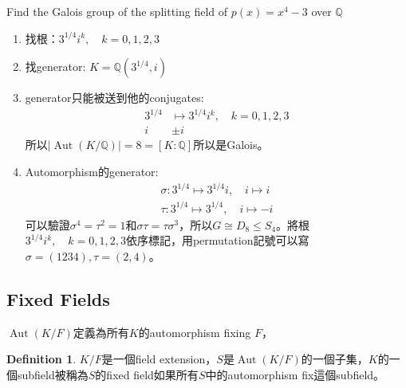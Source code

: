 \documentclass[12pt]{article}
\theoremstyle{definition}
\newtheorem{dfn}{Definition}
\newcommand{\FF}{\mathbb F}
\newcommand{\QQ}{\mathbb Q}
\DeclareMathOperator{\Aut}{Aut}
\begin{document}
\begin{ex}
	Find the Galois group of the splitting field of $p(x)=x^4-3$ over $\QQ$

	\begin{enumerate}
		\item 找根：$3^{1/4}i^k,\quad k=0,1,2,3$
		\item 找generator: $K=\QQ(3^{1/4},i)$
		\item generator只能被送到他的conjugates:
		      \begin{align*}
			      3^{1/4} & \mapsto 3^{1/4}i^k,\quad k=0,1,2,3 \\
			      i       & \pm i
		      \end{align*}
		      所以$|\Aut(K/\QQ)|=8=[K:\QQ]$所以是Galois。
		\item Automorphism的generator:
		      \begin{align*}
			      \sigma: 3^{1/4} \mapsto 3^{1/4}i, \quad i\mapsto i \\
			      \tau: 3^{1/4} \mapsto 3^{1/4}, \quad i\mapsto -i
		      \end{align*}
		      可以驗證$\sigma^4=\tau^2=1$和$\sigma\tau=\tau\sigma^3$，所以$G\cong D_8\le S_4$。將根$3^{1/4}i^k,\quad k=0,1,2,3$依序標記，用permutation記號可以寫$\sigma=(1234), \tau=(2,4)$。
	\end{enumerate}
\end{ex}






\subsection{Fixed Fields}

$\Aut(K/F)$定義為所有$K$的automorphism fixing $F$，

\begin{dfn}
	$K/F$是一個field extension，$S$是$\Aut(K/F)$的一個子集，$K$的一個subfield被稱為$S$的fixed field如果所有$S$中的automorphism fix這個subfield。
\end{dfn}
\end{document}

